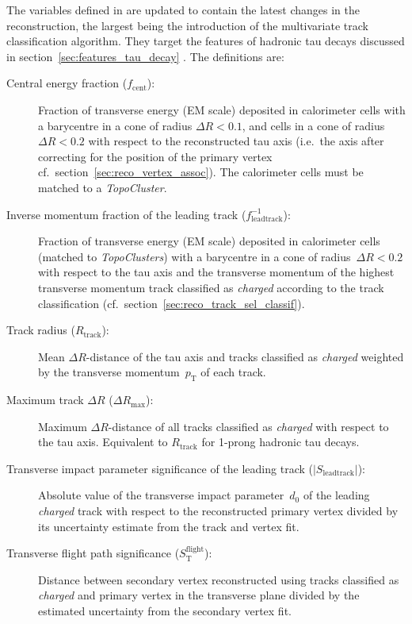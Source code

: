 The variables defined in \cite{atlas:taurec:run2} are updated to contain the
latest changes in the reconstruction, the largest being the introduction of the
multivariate track classification algorithm. They target the features of
hadronic tau decays discussed in section~\ref{sec:features_tau_decay} . The definitions are:
\begin{description}
\item[Central energy fraction ($f_\text{cent}$):] Fraction of transverse energy
  (EM scale) deposited in calorimeter cells with a barycentre in a cone of
  radius $\Delta R < 0.1$, and cells in a cone of radius $\Delta R < 0.2$ with
  respect to the reconstructed tau axis (i.e.\ the axis after correcting for the
  position of the primary vertex cf.\ section~\ref{sec:reco_vertex_assoc}). The
  calorimeter cells must be matched to a \emph{TopoCluster}.

\item[Inverse momentum fraction of the leading track
  ($f_\text{leadtrack}^{-1}$):] Fraction of transverse energy (EM scale)
  deposited in calorimeter cells (matched to \emph{TopoClusters}) with a
  barycentre in a cone of radius~$\Delta R < 0.2$ with respect to the tau axis
  and the transverse momentum of the highest transverse momentum track
  classified as \emph{charged} according to the track classification (cf.\
  section~\ref{sec:reco_track_sel_classif}).

\item[Track radius ($R_\text{track}$):] Mean $\Delta R$-distance of the tau axis
  and tracks classified as \emph{charged} weighted by the transverse
  momentum~$p_\text{T}$ of each track.

\item[Maximum track $\Delta R$ ($\Delta R_\text{max}$):] Maximum
  $\Delta R$-distance of all tracks classified as \emph{charged} with respect to
  the tau axis. Equivalent to $R_\text{track}$ for 1-prong hadronic tau decays.

\item[Transverse impact parameter significance of the leading track
  ($| S_\text{leadtrack} |$):] Absolute value of the transverse impact
  parameter~$d_0$ of the leading \emph{charged} track with respect to the
  reconstructed primary vertex divided by its uncertainty estimate from the
  track and vertex fit.

\item[Transverse flight path significance ($S_\text{T}^\text{flight}$):]
  Distance between secondary vertex reconstructed using tracks classified as
  \emph{charged} and primary vertex in the transverse plane divided by the
  estimated uncertainty from the secondary vertex fit.


\end{description}
